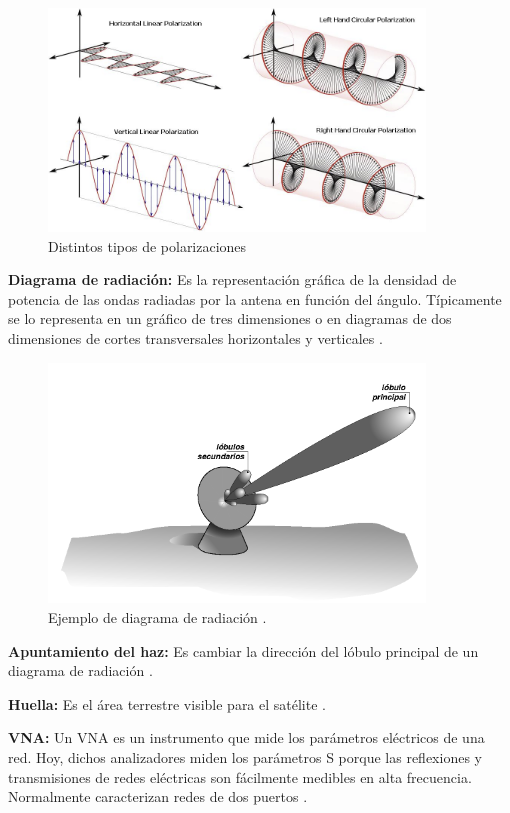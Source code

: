 \begin{figure}[H]
 \centering
 \includegraphics[width=10cm]{gfx/polarizations.png}
 \caption{Distintos tipos de polarizaciones \cite{polarization}}
 \label{fig:hvPolarizations}
\end{figure}

{\textbf{Diagrama de radiación:}} Es la representación gráfica de la densidad de potencia de las ondas radiadas por la antena
en función del ángulo. Típicamente se lo representa en un gráfico de tres dimensiones o en diagramas de dos dimensiones de
cortes transversales horizontales y verticales \cite{AntennaWiki}.

\begin{figure}[H]
 \centering
 \includegraphics[width=10cm]{gfx/arrayPattern.png}
 \caption{Ejemplo de diagrama de radiación \cite{diagramaRadiacion}.}
\end{figure}

{\textbf{Apuntamiento del haz:}} Es cambiar la dirección del lóbulo principal de un diagrama de radiación \cite{BeamSteering}.

{\textbf{Huella:}} Es el área terrestre visible para el satélite \cite{Footprint}. 

{\textbf{VNA:}} Un VNA es un instrumento que mide los parámetros eléctricos de una red. Hoy, dichos analizadores miden los 
parámetros S porque las reflexiones y transmisiones de redes eléctricas son fácilmente medibles en alta frecuencia. Normalmente
caracterizan redes de dos puertos \cite{NetworkAnalyzer}.

